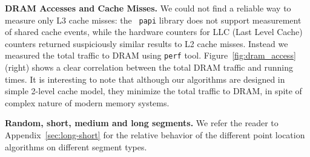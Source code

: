 \textbf{DRAM Accesses and Cache Misses.} 
We could not find a reliable way to measure only L3 cache misses: the {\tt
papi} library does not support measurement of shared cache events, while the
hardware counters for LLC (Last Level Cache) counters returned suspiciously
similar results to L2 cache misses.  Instead we measured the total traffic to
DRAM using {\tt perf} tool.  Figure~\ref{fig:dram_access} (right) shows a clear
correlation between the total DRAM traffic and running times. It is interesting
to note that although our algorithms are designed in simple 2-level cache
model, they minimize the total traffic to DRAM, in spite of complex nature of
modern memory systems.

\textbf{Random, short, medium and long segments.}
We refer the reader to
Appendix~\ref{sec:long-short} for the relative behavior of the
different point location 
algorithms on different segment types.

